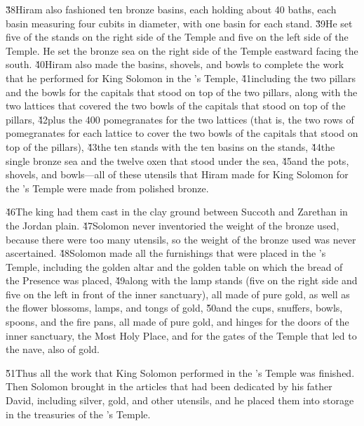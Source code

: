 \v{38}Hiram also fashioned ten bronze basins, each holding about 40 baths, each basin measuring four cubits in diameter, with one basin for each stand. \v{39}He set five of the stands on the right side of the Temple and five on the left side of the Temple. He set the bronze sea on the right side of the Temple eastward facing the south. \v{40}Hiram also made the basins, shovels, and bowls to complete the work that he performed for King Solomon in the 's Temple, \v{41}including the two pillars and the bowls for the capitals that stood on top of the two pillars, along with the two lattices that covered the two bowls of the capitals that stood on top of the pillars, \v{42}plus the 400 pomegranates for the two lattices (that is, the two rows of pomegranates for each lattice to cover the two bowls of the capitals that stood on top of the pillars), \v{43}the ten stands with the ten basins on the stands, \v{44}the single bronze sea and the twelve oxen that stood under the sea, \v{45}and the pots, shovels, and bowls---all of these utensils that Hiram made for King Solomon for the 's Temple were made from polished bronze.

\v{46}The king had them cast in the clay ground between Succoth and Zarethan in the Jordan plain. \v{47}Solomon never inventoried the weight of the bronze used, because there were too many utensils, so the weight of the bronze used was never ascertained. \v{48}Solomon made all the furnishings that were placed in the 's Temple, including the golden altar and the golden table on which the bread of the Presence was placed, \v{49}along with the lamp stands (five on the right side and five on the left in front of the inner sanctuary), all made of pure gold, as well as the flower blossoms, lamps, and tongs of gold, \v{50}and the cups, snuffers, bowls, spoons, and the fire pans, all made of pure gold, and hinges for the doors of the inner sanctuary, the Most Holy Place, and for the gates of the Temple that led to the nave, also of gold.

\v{51}Thus all the work that King Solomon performed in the 's Temple was finished. Then Solomon brought in the articles that had been dedicated by his father David, including silver, gold, and other utensils, and he placed them into storage in the treasuries of the 's Temple.

